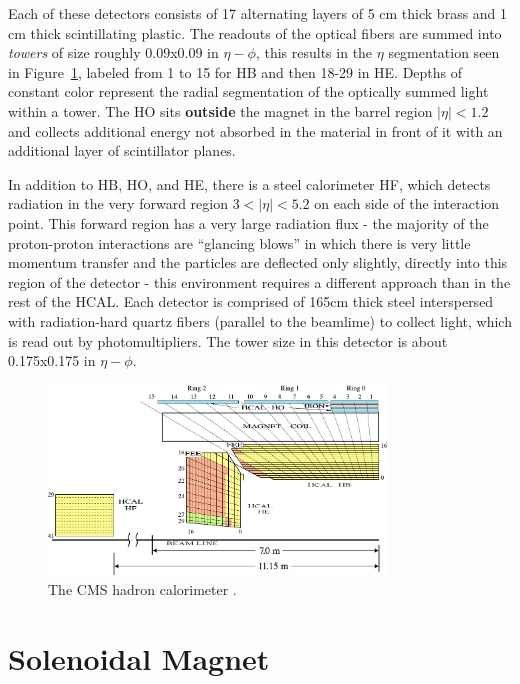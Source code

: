Each of these detectors consists of 17 alternating layers of 5 cm thick brass and 1 cm thick scintillating plastic. The readouts of the optical fibers are summed into \textit{towers} of size roughly 0.09x0.09 in $\eta-\phi$, this results in the $\eta$ segmentation seen in Figure~\ref{fig:hcal}, labeled from 1 to 15 for HB and then 18-29 in HE.  Depths of constant color represent the radial segmentation of the optically summed light within a tower. The HO sits \textbf{outside} the magnet in the barrel region $|\eta|<1.2$ and collects additional energy not absorbed in the material in front of it with an additional layer of scintillator planes.

In addition to HB, HO, and HE, there is a steel calorimeter HF, which detects radiation in the very forward region $3<|\eta|<5.2$ on each side of the interaction point. This forward region has a very large radiation flux - the majority of the proton-proton interactions are ``glancing blows'' in which there is very little momentum transfer and the particles are deflected only slightly, directly into this region of the detector - this environment requires a different approach than in the rest of the HCAL. Each detector is comprised of 165cm thick steel interspersed with radiation-hard quartz fibers (parallel to the beamlime) to collect light, which is read out by photomultipliers. The tower size in this detector is about 0.175x0.175 in $\eta-\phi$.

\begin{figure}
\centering
\includegraphics[width=0.8\textwidth]{figs/hcal.pdf}
\caption[The CMS hadron calorimeter.]{The CMS hadron calorimeter \cite{cosmichcal}.}
\label{fig:hcal}
\end{figure}

\section{Solenoidal Magnet}

